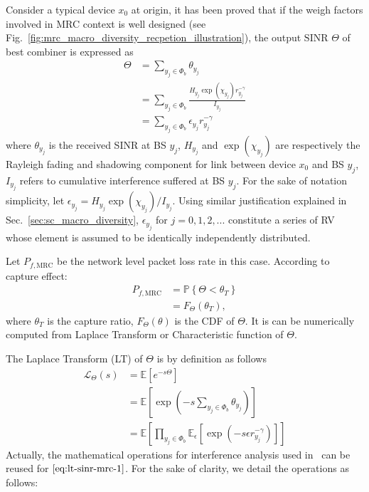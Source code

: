 Consider a typical device $x_0$ at origin, it has been proved that if the weigh factors involved in MRC context is well designed (see Fig.~\ref{fig:mrc_macro_diversity_recpetion_illustration}), the output $\text{SINR}$ $\Theta$ of best combiner is expressed as 
\begin{align}
\Theta &= \sum_{y_j \in \Phi_{b}}^{} \theta_{y_j} \nonumber\\
&= \sum_{y_j \in \Phi_{b}}^{} \frac{H_{y_j} \exp(\chi_{y_j}) r_{y_j}^{-\gamma}}{I_{y_j}} \nonumber\\
&= \sum_{y_j \in \Phi_{b}}^{} \epsilon_{y_j} r_{y_j}^{-\gamma}
\end{align}
where $\theta_{y_j}$ is the received SINR at BS $y_j$, $H_{y_{j}}$ and $\exp(\chi_{y_j})$ are respectively the Rayleigh fading and shadowing component for link between device $x_0$ and BS $y_j$, $I_{y_j}$ refers to cumulative interference suffered at BS $y_j$. For the sake of notation simplicity, let $\epsilon_{y_j}  = H_{y_j}\exp(\chi_{y_j})  / I_{y_j}$. Using similar justification explained in Sec.~\ref{sec:sc_macro_diversity}, $\epsilon_{y_j}$ for $j=0,1,2,...$ constitute a series of RV whose element is assumed to be identically independently distributed. 

Let $P_{f, \text{MRC}}$ be the network level packet loss rate in this case. According to capture effect:
\begin{align}
	P_{f, \text{MRC}} &= \mathbb{P} \left\lbrace \Theta < \theta_{T} \right\rbrace \nonumber \\
	&= F_{\Theta} (\theta_{T}),
\end{align}
where $\theta_{T}$ is the capture ratio, $F_{\Theta} (\theta)$ is the CDF of $\Theta$. It is can be numerically computed from Laplace Transform or Characteristic function of $\Theta$.

The Laplace Transform (LT) of $\Theta$ is by definition as follows
\begin{align}
\label{eq:lt-sinr-mrc-1}
\mathcal{L}_{\Theta}\left( s \right) &= \mathbb{E}\left[ e^{-s\Theta}\right] \nonumber\\
&=\mathbb{E}\left[ \exp( -s \sum_{y_j \in \Phi_{b}}^{} \theta_{y_j} )\right] \nonumber\\
&= \mathbb{E}\left[ \prod_{y_j \in \Phi_b}^{} \mathbb{E}_{\epsilon} \left[ \exp( -s \epsilon r_{y_{j}}^{-\gamma}) \right] \right] 
\end{align}
Actually, the mathematical operations for interference analysis used in~\cite{haenggi2009interference} can be reused for $\eqref{eq:lt-sinr-mrc-1}$. For the sake of clarity, we detail the operations as follows:
 
